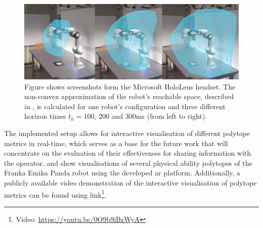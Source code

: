 \begin{figure}[!h]
    \centering 
    \includegraphics[width=\linewidth]{Papers/images/reachable_space_curved_ar.jpg}
    \caption{Figure shows screenshots form the Microsoft HoloLens headset. The non-convex approximation of the robot's reachable space, described in  , is calculated for one robot's configuration and three different horizon times $t_h=100$, $200$ and $300$ms (from left to right).}
    \label{fig:ar_images2}
\end{figure}


The implemented setup allows for interactive visualisation of different polytope metrics in real-time, which serves as a base for the future work that will concentrate on the evaluation of their effectiveness for sharing information with the operator.  and  show visualisations of several physical ability polytopes of the Franka Emika Panda robot using the developed \gls{ar} platform. Additionally, a publicly available video demonstration of the interactive visualisation of polytope metrics can be found using link\footnote{Video: \url{https://youtu.be/0O9b9iBzWyA}}.



